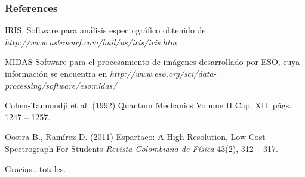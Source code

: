 \documentclass{beamer}
\begin{document}

\begin{frame}
\frametitle{References}
\footnotesize{
\begin{thebibliography}{99} %
 IRIS. 
\newblock Software para análisis espectográfico obtenido de \emph{http://www.astrosurf.com/buil/us/iris/iris.htm}


 MIDAS
\newblock Software para el procesamiento de imágenes desarrollado por ESO, cuya información se encuentra en
\emph{http://www.eso.org/sci/data-processing/software/esomidas/}

 Cohen-Tannoudji et al. (1992)
\newblock Quantum Mechanics Volume II
\newblock Cap. XII, págs. 1247 -- 1257.

 Oostra B., Ramírez D. (2011)
\newblock Espartaco: A High-Resolution, Low-Cost Spectrograph For Students 
\newblock \emph{Revista Colombiana de Física} 43(2), 312 -- 317.
\end{thebibliography}
}
\end{frame}


\begin{frame}
\Huge{\centerline{Gracias...totales.}}
\end{frame}

\end{document}
